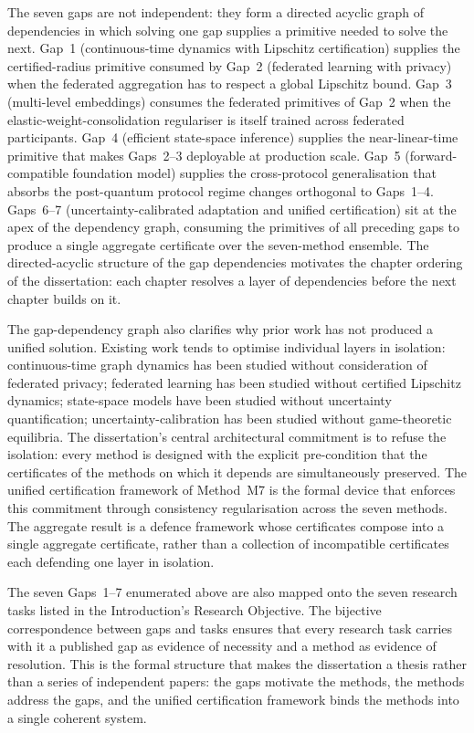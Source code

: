 The seven gaps are not independent: they form a directed acyclic graph of dependencies in which solving one gap supplies a primitive needed to solve the next. Gap~1 (continuous-time dynamics with Lipschitz certification) supplies the certified-radius primitive consumed by Gap~2 (federated learning with privacy) when the federated aggregation has to respect a global Lipschitz bound. Gap~3 (multi-level embeddings) consumes the federated primitives of Gap~2 when the elastic-weight-consolidation regulariser is itself trained across federated participants. Gap~4 (efficient state-space inference) supplies the near-linear-time primitive that makes Gaps~2--3 deployable at production scale. Gap~5 (forward-compatible foundation model) supplies the cross-protocol generalisation that absorbs the post-quantum protocol regime changes orthogonal to Gaps~1--4. Gaps~6--7 (uncertainty-calibrated adaptation and unified certification) sit at the apex of the dependency graph, consuming the primitives of all preceding gaps to produce a single aggregate certificate over the seven-method ensemble. The directed-acyclic structure of the gap dependencies motivates the chapter ordering of the dissertation: each chapter resolves a layer of dependencies before the next chapter builds on it.

The gap-dependency graph also clarifies why prior work has not produced a unified solution. Existing work tends to optimise individual layers in isolation: continuous-time graph dynamics has been studied without consideration of federated privacy; federated learning has been studied without certified Lipschitz dynamics; state-space models have been studied without uncertainty quantification; uncertainty-calibration has been studied without game-theoretic equilibria. The dissertation's central architectural commitment is to refuse the isolation: every method is designed with the explicit pre-condition that the certificates of the methods on which it depends are simultaneously preserved. The unified certification framework of Method~M7 is the formal device that enforces this commitment through consistency regularisation across the seven methods. The aggregate result is a defence framework whose certificates compose into a single aggregate certificate, rather than a collection of incompatible certificates each defending one layer in isolation.

The seven Gaps~1--7 enumerated above are also mapped onto the seven research tasks listed in the Introduction's Research Objective. The bijective correspondence between gaps and tasks ensures that every research task carries with it a published gap as evidence of necessity and a method as evidence of resolution. This is the formal structure that makes the dissertation a thesis rather than a series of independent papers: the gaps motivate the methods, the methods address the gaps, and the unified certification framework binds the methods into a single coherent system.

